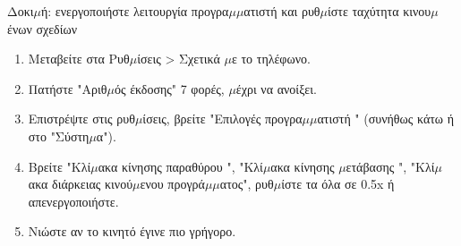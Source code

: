 \begin{tcbpractice}{Δοκι$\mu$ή: ενεργοποιήστε λειτουργία προγρα$\mu$$\mu$ατιστή και ρυθ$\mu$ίστε ταχύτητα κινου$\mu$ένων σχεδίων}
\begin{enumerate}
  \item Μεταβείτε στα Ρυθ$\mu$ίσεις > Σχετικά $\mu$ε το τηλέφωνο.
  \item Πατήστε "Αριθ$\mu$ός έκδοσης" 7 φορές, $\mu$έχρι να ανοίξει.
  \item Επιστρέψτε στις ρυθ$\mu$ίσεις, βρείτε "Επιλογές προγρα$\mu$$\mu$ατιστή " (συνήθως κάτω ή στο "Σύστη$\mu$α").
  \item Βρείτε "Κλί$\mu$ακα κίνησης παραθύρου ", "Κλί$\mu$ακα κίνησης $\mu$ετάβασης ", "Κλί$\mu$ακα διάρκειας κινού$\mu$ενου προγρά$\mu$$\mu$ατος", ρυθ$\mu$ίστε τα όλα σε 0.5x ή απενεργοποιήστε.
  \item Νιώστε αν το κινητό έγινε πιο γρήγορο.
\end{enumerate}

\end{tcbpractice}
